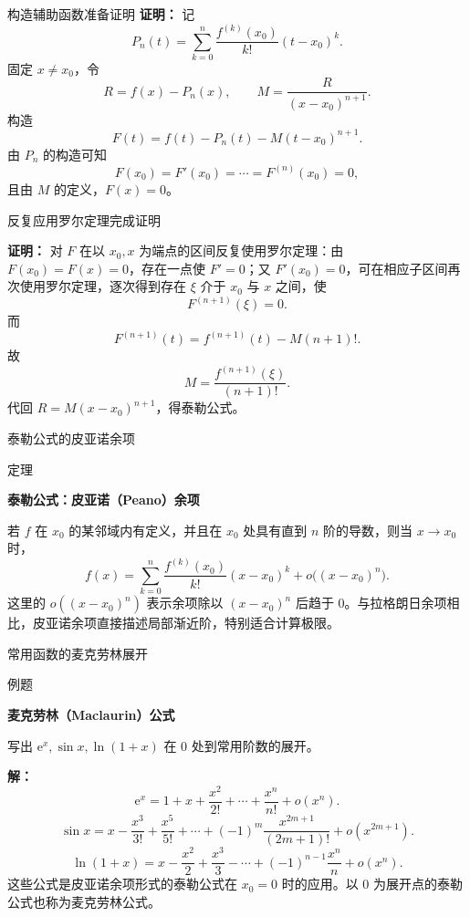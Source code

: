 \documentclass[aspectratio=169,10pt,fontset=fandol]{ctexbeamer}
\newcommand{\ee}{\mathrm{e}}
\begin{document}
\begin{frame}[t,fragile]{构造辅助函数准备证明}
\footnotesize
{\footnotesize
\textbf{证明：}
记
\[
P_n(t)=\sum_{k=0}^{n}\frac{f^{(k)}(x_0)}{k!}(t-x_0)^k.
\]
固定 $x\neq x_0$，令
\[
R=f(x)-P_n(x),\qquad
M=\frac{R}{(x-x_0)^{n+1}}.
\]
构造
\[
F(t)=f(t)-P_n(t)-M(t-x_0)^{n+1}.
\]
由 $P_n$ 的构造可知
\[
F(x_0)=F'(x_0)=\cdots=F^{(n)}(x_0)=0,
\]
且由 $M$ 的定义，$F(x)=0$。
}
\end{frame}
\begin{frame}[t,fragile]{反复应用罗尔定理完成证明}
\footnotesize
{\footnotesize
\textbf{证明：}
 对 $F$ 在以 $x_0,x$ 为端点的区间反复使用罗尔定理：由 $F(x_0)=F(x)=0$，存在一点使 $F'=0$；又 $F'(x_0)=0$，可在相应子区间再次使用罗尔定理，逐次得到存在 $\xi$ 介于 $x_0$ 与 $x$ 之间，使
\[
F^{(n+1)}(\xi)=0.
\]
而
\[
F^{(n+1)}(t)=f^{(n+1)}(t)-M(n+1)!.
\]
故
\[
M=\frac{f^{(n+1)}(\xi)}{(n+1)!}.
\]
代回 $R=M(x-x_0)^{n+1}$，得泰勒公式。

}
\end{frame}
\begin{frame}[t,fragile]{泰勒公式的皮亚诺余项}
\normalsize
\begin{block}{定理}
{\normalsize
\textbf{泰勒公式：皮亚诺（Peano）余项}\par

若 \(f\) 在 \(x_0\) 的某邻域内有定义，并且在 \(x_0\) 处具有直到 \(n\) 阶的导数，则当 \(x\to x_0\) 时，
\[
f(x)=\sum_{k=0}^{n}\frac{f^{(k)}(x_0)}{k!}(x-x_0)^k
+o\bigl((x-x_0)^n\bigr).
\]
这里的 \(o((x-x_0)^n)\) 表示余项除以 \((x-x_0)^n\) 后趋于 \(0\)。与拉格朗日余项相比，皮亚诺余项直接描述局部渐近阶，特别适合计算极限。

}
\end{block}
\end{frame}
\begin{frame}[t,fragile]{常用函数的麦克劳林展开}
\normalsize
\begin{block}{例题}
{\normalsize
\textbf{麦克劳林（Maclaurin）公式}\par

写出 $\ee^x,\sin x,\ln(1+x)$ 在 $0$ 处到常用阶数的展开。

}
\end{block}
\pause
{\normalsize
\textbf{解：}
\[
\ee^x=1+x+\frac{x^2}{2!}+\cdots+\frac{x^n}{n!}+o(x^n).
\]
\[
\sin x=x-\frac{x^3}{3!}+\frac{x^5}{5!}+\cdots+(-1)^m\frac{x^{2m+1}}{(2m+1)!}+o(x^{2m+1}).
\]
\[
\ln(1+x)=x-\frac{x^2}{2}+\frac{x^3}{3}-\cdots+(-1)^{n-1}\frac{x^n}{n}+o(x^n).
\]
这些公式是皮亚诺余项形式的泰勒公式在 \(x_0=0\) 时的应用。以 \(0\) 为展开点的泰勒公式也称为麦克劳林公式。

}
\end{frame}
\end{document}
